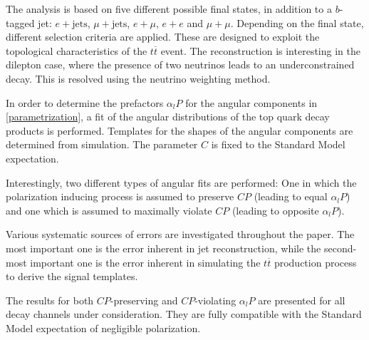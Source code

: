 The analysis is based on five different possible final states, in addition to a $b$-tagged jet: $e + \text{jets}$, $\mu + \text{jets}$, $e + \mu$, $e + e$ and $\mu + \mu$.
Depending on the final state, different selection criteria are applied.
These are designed to exploit the topological characteristics of the $t\overline{t}$ event.
The reconstruction is interesting in the dilepton case, where the presence of two neutrinos leads to an underconstrained decay.
This is resolved using the neutrino weighting method.

In order to determine the prefactors $\alpha_l P$ for the angular components in \eqref{parametrization}, a fit of the angular distributions of the top quark decay products is performed.
Templates for the shapes of the angular components are determined from simulation.
The parameter $C$ is fixed to the Standard Model expectation.

Interestingly, two different types of angular fits are performed: One in which the polarization inducing process is assumed to preserve $CP$ (leading to equal $\alpha_l P$) and one which is assumed to maximally violate $CP$ (leading to opposite $\alpha_l P$).

Various systematic sources of errors are investigated throughout the paper.
The most important one is the error inherent in jet reconstruction, while the second-most important one is the error inherent in simulating the $t\overline{t}$ production process to derive the signal templates.

The results for both $CP$-preserving and $CP$-violating $\alpha_l P$ are presented for all decay channels under consideration.
They are fully compatible with the Standard Model expectation of negligible polarization.

